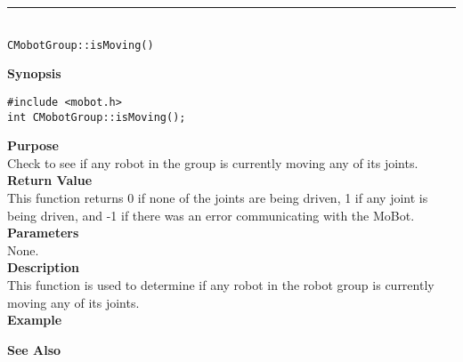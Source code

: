 \noindent
\vspace{5pt}
\rule{4.5in}{0.015in}\\
\noindent
{\LARGE \texttt{CMobotGroup::isMoving()}}\\
{}

\noindent
{\bf Synopsis}\\
\begin{verbatim}
#include <mobot.h>
int CMobotGroup::isMoving();
\end{verbatim}

\noindent
{\bf Purpose}\\
Check to see if any robot in the group is currently moving any of its joints.\\

\noindent
{\bf Return Value}\\
This function returns 0 if none of the joints are being driven, 1 if any joint
is being driven, and -1 if there was an error communicating with the MoBot.\\

\noindent
{\bf Parameters}\\
None.\\

\noindent
{\bf Description}\\
This function is used to determine if any robot in the robot group is currently moving any of
its joints. \\

\noindent
{\bf Example}\\
\noindent

\noindent
{\bf See Also}\\

